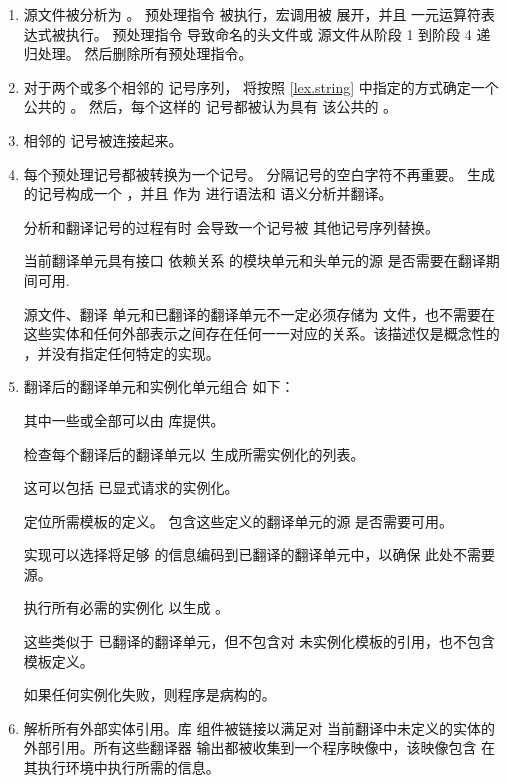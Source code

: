 \begin{enumerate}
\item 源文件被分析为 。
预处理指令 被执行，宏调用被
展开，并且  一元运算符表达式被执行。
 预处理指令 导致命名的头文件或
源文件从阶段 1 到阶段 4 递归处理。
然后删除所有预处理指令。

\item
对于两个或多个相邻的  记号序列，
将按照 \ref{lex.string} 中指定的方式确定一个公共的 。
然后，每个这样的  记号都被认为具有
该公共的 。

\item
相邻的  记号被连接起来。

\item
每个预处理记号都被转换为一个记号。
分隔记号的空白字符不再重要。
生成的记号构成一个 ，并且
作为  进行语法和
语义分析并翻译。
\begin{note}
分析和翻译记号的过程有时
会导致一个记号被
其他记号序列替换。
\end{note}
当前翻译单元具有接口
依赖关系
的模块单元和头单元的源
是否需要在翻译期间可用.
\begin{note}
源文件、翻译
单元和已翻译的翻译单元不一定必须存储为
文件，也不需要在这些实体和任何外部表示之间存在任何一一对应的关系。该描述仅是概念性的
，并没有指定任何特定的实现。
\end{note}

\item 翻译后的翻译单元和实例化单元组合
如下：
\begin{note}
其中一些或全部可以由
库提供。
\end{note}
检查每个翻译后的翻译单元以
生成所需实例化的列表。
\begin{note}
这可以包括
已显式请求的实例化。
\end{note}
定位所需模板的定义。
包含这些定义的翻译单元的源
是否需要可用。
\begin{note}
实现可以选择将足够
的信息编码到已翻译的翻译单元中，以确保
此处不需要源。
\end{note}
执行所有必需的实例化
以生成 。
\begin{note}
这些类似于
已翻译的翻译单元，但不包含对
未实例化模板的引用，也不包含模板定义。
\end{note}
如果任何实例化失败，则程序是病构的。

\item 解析所有外部实体引用。库
组件被链接以满足对
当前翻译中未定义的实体的外部引用。所有这些翻译器
输出都被收集到一个程序映像中，该映像包含
在其执行环境中执行所需的信息。%
\end{enumerate}

